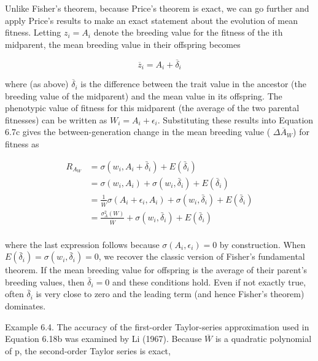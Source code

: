 \documentclass{article}
\begin{document}
Unlike Fisher’s theorem, because Price’s theorem is exact, we can go further and apply Price’s results to make an exact statement about the evolution of mean fitness. Letting  $ z_{i} = A_{i} $ denote the breeding value for the fitness of the ith midparent, the mean breeding value in their offspring becomes

\begin{equation}
\overline{z}_{i}=A_{i}+\overline{\delta}_{i}
\tag{6.20a}
\label{eq:6_20a}
\end{equation}

where (as above)  $ \overline{\delta}_i $ is the difference between the trait value in the ancestor (the breeding value of the midparent) and the mean value in its offspring. The phenotypic value of fitness for this midparent (the average of the two parental fitnesses) can be written as  $ W_i = A_i + \epsilon_i $. Substituting these results into Equation 6.7c gives the between-generation change in the mean breeding value ( $ \Delta \overline{A}_W $) for fitness as

\begin{equation}
\begin{aligned}R_{A_{W}}&=\sigma(w_{i},A_{i}+\bar{\delta}_{i})+E(\bar{\delta}_{i})\\&=\sigma(w_{i},A_{i})+\sigma(w_{i},\bar{\delta}_{i})+E(\bar{\delta}_{i})\\&=\frac{1}{\overline{W}}\sigma(A_{i}+\epsilon_{i},A_{i})+\sigma(w_{i},\bar{\delta}_{i})+E(\bar{\delta}_{i})\\&=\frac{\sigma_{A}^{2}(W)}{\overline{W}}+\sigma(w_{i},\bar{\delta}_{i})+E(\bar{\delta}_{i})\\ \end{aligned}
\tag{6.20b}
\label{eq:6_20b}
\end{equation}

where the last expression follows because  $ \sigma(A_i, \epsilon_i) = 0 $ by construction. When  $ E(\bar{\delta}_i) = \sigma(w_i, \bar{\delta}_i) = 0 $, we recover the classic version of Fisher's fundamental theorem. If the mean breeding value for offspring is the average of their parent's breeding values, then  $ \bar{\delta}_i = 0 $ and these conditions hold. Even if not exactly true, often  $ \bar{\delta}_i $ is very close to zero and the leading term (and hence Fisher's theorem) dominates.

Example 6.4. The accuracy of the first-order Taylor-series approximation used in Equation 6.18b was examined by Li (1967). Because  $ \overline{W} $ is a quadratic polynomial of p, the second-order Taylor series is exact,
\end{document}
